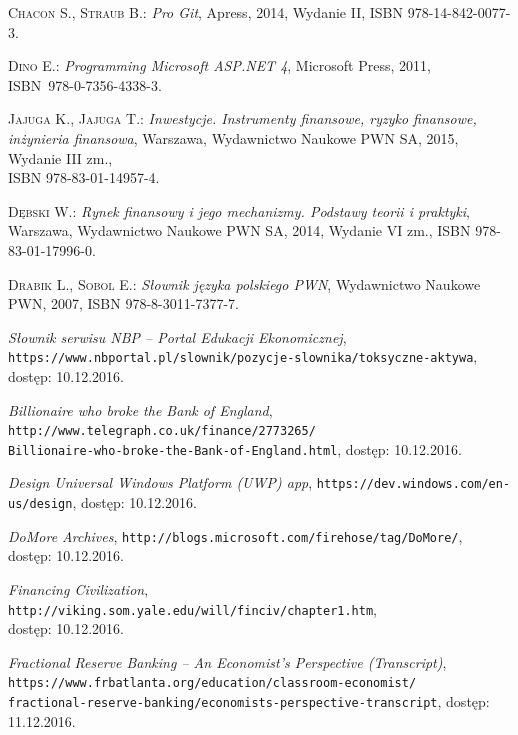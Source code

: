 \documentclass[a4paper,twoside,titlepage,openright]{book}
\begin{document}
 
 
 
\listoffigures


\begin{thebibliography}{99}

 \textsc{Chacon S., Straub B.:}
\textit{Pro Git}, Apress, 2014, Wydanie II, ISBN 978-14-842-0077-3.

 \textsc{Dino E.:}
\textit{Programming Microsoft ASP.NET 4}, Microsoft Press, 2011, \\ISBN~978-0-7356-4338-3.

 \textsc{Jajuga K., Jajuga T.:}
\textit{Inwestycje. Instrumenty finansowe, ryzyko finansowe, inżynieria finansowa}, Warszawa, Wydawnictwo Naukowe PWN SA, 2015, Wydanie III zm., \\ISBN 978-83-01-14957-4.

 \textsc{Dębski W.:}
\textit{Rynek finansowy i jego mechanizmy. Podstawy teorii i praktyki}, Warszawa, Wydawnictwo Naukowe PWN SA, 2014, Wydanie VI zm., ISBN 978-83-01-17996-0.

 \textsc{Drabik L., Sobol	E.:}
\textit{Słownik języka polskiego PWN}, Wydawnictwo Naukowe PWN, 2007, ISBN 978-8-3011-7377-7.

 \textit{Słownik serwisu NBP -- Portal Edukacji Ekonomicznej}, \\
\texttt{https://www.nbportal.pl/slownik/pozycje-slownika/toksyczne-aktywa}, \\dostęp: 10.12.2016.

 \textit{Billionaire who broke the Bank of England}, 
\texttt{http://www.telegraph.co.uk/finance/2773265/\\Billionaire-who-broke-the-Bank-of-England.html}, dostęp: 10.12.2016.

 \textit{Design Universal Windows Platform (UWP) app}, 
\texttt{https://dev.windows.com/en-us/design}, dostęp: 10.12.2016.

 \textit{DoMore Archives}, 
\texttt{http://blogs.microsoft.com/firehose/tag/DoMore/}, \\dostęp: 10.12.2016.

 \textit{Financing Civilization}, 
\texttt{http://viking.som.yale.edu/will/finciv/chapter1.htm}, \\dostęp: 10.12.2016.

 \textit{Fractional Reserve Banking -- An Economist's Perspective (Transcript)}, \\
\texttt{https://www.frbatlanta.org/education/classroom-economist/\\fractional-reserve-banking/economists-perspective-transcript}, dostęp: 11.12.2016.


\end{thebibliography}
\end{document}
